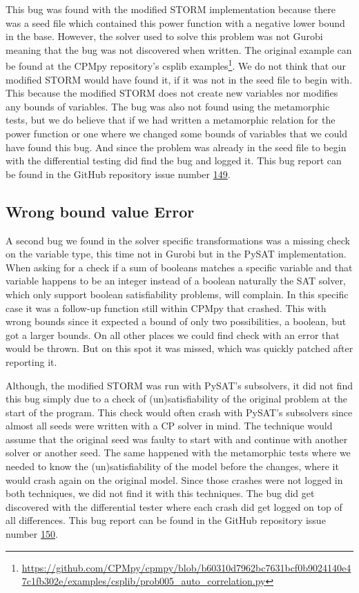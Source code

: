 This bug was found with the modified STORM implementation because there was a seed file which contained this power function with a negative lower bound in the base. However, the solver used to solve this problem was not Gurobi meaning that the bug was not discovered when written. The original example can be found at the CPMpy repository's csplib examples\footnote{\url{https://github.com/CPMpy/cpmpy/blob/b60310d7962bc7631bcf0b9024140e47c1fb302e/examples/csplib/prob005_auto_correlation.py}}. We do not think that our modified STORM would have found it, if it was not in the seed file to begin with. This because the modified STORM does not create new variables nor modifies any bounds of variables. The bug was also not found using the metamorphic tests, but we do believe that if we had written a metamorphic relation for the power function or one where we changed some bounds of variables that we could have found this bug. And since the problem was already in the seed file to begin with the differential testing did find the bug and logged it.
This bug report can be found in the GitHub repository issue number \href{https://github.com/CPMpy/cpmpy/issues/149}{149}.

\subsection{Wrong bound value Error}
\label{res:bug:WrongBounds}
A second bug we found in the solver specific transformations was a missing check on the variable type, this time not in Gurobi but in the PySAT implementation. When asking for a check if a sum of booleans matches a specific variable and that variable happens to be an integer instead of a boolean naturally the SAT solver, which only support boolean satisfiability problems, will complain. In this specific case it was a follow-up function still within CPMpy that crashed. This with wrong bounds since it expected a bound of only two possibilities, a boolean, but got a larger bounds. On all other places we could find check with an error that would be thrown. But on this spot it was missed, which was quickly patched after reporting it.

Although, the modified STORM was run with PySAT's subsolvers, it did not find this bug simply due to a check of (un)satisfiability of the original problem at the start of the program. This check would often crash with PySAT's subsolvers since almost all seeds were written with a CP solver in mind. The technique would assume that the original seed was faulty to start with and continue with another solver or another seed. The same happened with the metamorphic tests where we needed to know the (un)satisfiability of the model before the changes, where it would crash again on the original model. Since those crashes were not logged in both techniques, we did not find it with this techniques. The bug did get discovered with the differential tester where each crash did get logged on top of all differences. This bug report can be found in the GitHub repository issue number \href{https://github.com/CPMpy/cpmpy/issues/150}{150}.

